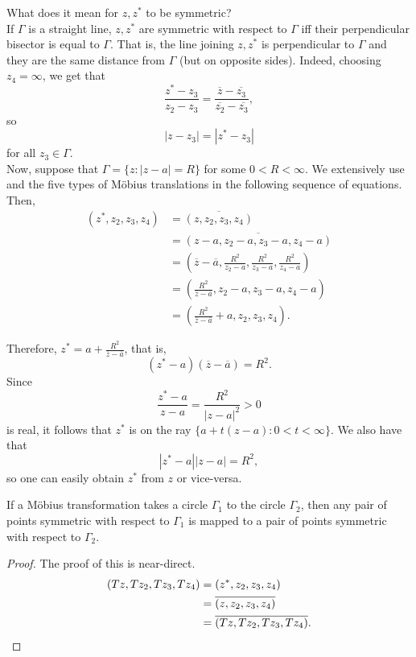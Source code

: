 	What does it mean for $z,z^*$ to be symmetric?\\
	If $\Gamma$ is a straight line, $z,z^*$ are symmetric with respect to $\Gamma$ iff their perpendicular bisector is equal to $\Gamma$. That is, the line joining $z,z^*$ is perpendicular to $\Gamma$ and they are the same distance from $\Gamma$ (but on opposite sides). Indeed, choosing $z_4 = \infty$, we get that
	\[ \frac{z^* - z_3}{z_2 - z_3} = \frac{\overline{z} - \overline{z_3}}{\overline{z_2} - \overline{z_3}}, \]
	so
	\[ |z - z_3| = |z^* - z_3| \]
	for all $z_3 \in \Gamma$.\\
	Now, suppose that $\Gamma = \{ z : |z-a| = R \}$ for some $0 < R < \infty$. We extensively use  and the five types of M\"{o}bius translations in the following sequence of equations. Then,
	\begin{align*}
		(z^*,z_2,z_3,z_4) &= \overline{(z,z_2,z_3,z_4)} \\
			&= \overline{(z-a,z_2-a,z_3-a,z_4-a)} \\
			&= \left(\overline{z}-\overline{a},\frac{R^2}{z_2 - a},\frac{R^2}{z_3 - a},\frac{R^2}{z_4 - a}\right) \\
			&= \left(\frac{R^2}{\overline{z}-\overline{a}},z_2-a,z_3-a,z_4-a\right) \\
			&= \left( \frac{R^2}{\overline{z} - \overline{a}} + a , z_2, z_3, z_4 \right).
	\end{align*}

	Therefore, $z^* = a + \frac{R^2}{\overline{z}-\overline{a}}$, that is,
	\[ (z^* - a) (\overline{z} - \overline{a}) = R^2. \]
	Since
	\[ \frac{z^* - a}{z - a} = \frac{R^2}{|z-a|^2} > 0 \]
	is real, it follows that $z^*$ is on the ray $\{a + t(z-a) : 0 < t < \infty\}$. We also have that
	\[ |z^* - a| |z - a| = R^2, \]
	so one can easily obtain $z^*$ from $z$ or vice-versa. 

	\begin{lemma}
		If a M\"{o}bius transformation takes a circle $\Gamma_1$ to the circle $\Gamma_2$, then any pair of points symmetric with respect to $\Gamma_1$ is mapped to a pair of points symmetric with respect to $\Gamma_2$.
	\end{lemma}
	\begin{proof}
		The proof of this is near-direct.
		\begin{align*}
			(Tz,Tz_2,Tz_3,Tz_4) &= (z^*,z_2,z_3,z_4) \\
				&= \overline{(z,z_2,z_3,z_4)} \\
				&= \overline{(Tz,Tz_2,Tz_3,Tz_4)}. \qedhere
		\end{align*}
	\end{proof}


